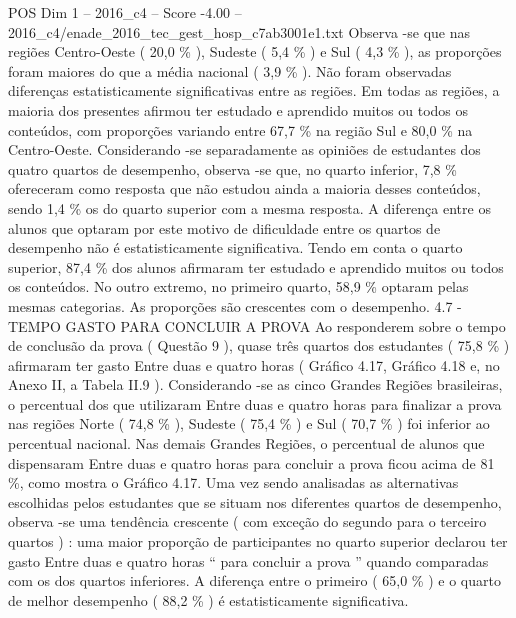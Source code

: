 \begin{textsample}{POS Dim 1 – 2016\_c4 – Score -4.00 – 2016\_c4/enade\_2016\_tec\_gest\_hosp\_c7ab3001e1.txt}
Observa -se que nas regiões Centro-Oeste ( 20,0 \% ), Sudeste ( 5,4 \% ) e Sul ( 4,3 \% ), as proporções foram maiores do que a média nacional ( 3,9 \% ).
Não foram observadas diferenças estatisticamente significativas entre as regiões.
Em todas as regiões, a maioria dos presentes afirmou ter estudado e aprendido muitos ou todos os conteúdos, com proporções variando entre 67,7 \% na região Sul e 80,0 \% na Centro-Oeste.
Considerando -se separadamente as opiniões de estudantes dos quatro quartos de desempenho, observa -se que, no quarto inferior, 7,8 \% ofereceram como resposta que não estudou ainda a maioria desses conteúdos, sendo 1,4 \% os do quarto superior com a mesma resposta.
A diferença entre os alunos que optaram por este motivo de dificuldade entre os quartos de desempenho não é estatisticamente significativa.
Tendo em conta o quarto superior, 87,4 \% dos alunos afirmaram ter estudado e aprendido muitos ou todos os conteúdos.
No outro extremo, no primeiro quarto, 58,9 \% optaram pelas mesmas categorias.
As proporções são crescentes com o desempenho. 4.7 - TEMPO GASTO PARA CONCLUIR A PROVA Ao responderem sobre o tempo de conclusão da prova ( Questão 9 ), quase três quartos dos estudantes ( 75,8 \% ) afirmaram ter gasto Entre duas e quatro horas ( Gráfico 4.17, Gráfico 4.18 e, no Anexo II, a Tabela II.9 ).
Considerando -se as cinco Grandes Regiões brasileiras, o percentual dos que utilizaram Entre duas e quatro horas para finalizar a prova nas regiões Norte ( 74,8 \% ), Sudeste ( 75,4 \% ) e Sul ( 70,7 \% ) foi inferior ao percentual nacional.
Nas demais Grandes Regiões, o percentual de alunos que dispensaram Entre duas e quatro horas para concluir a prova ficou acima de 81 \%, como mostra o Gráfico 4.17.
Uma vez sendo analisadas as alternativas escolhidas pelos estudantes que se situam nos diferentes quartos de desempenho, observa -se uma tendência crescente ( com exceção do segundo para o terceiro quartos ) : uma maior proporção de participantes no quarto superior declarou ter gasto Entre duas e quatro horas “ para concluir a prova ” quando comparadas com os dos quartos inferiores.
A diferença entre o primeiro ( 65,0 \% ) e o quarto de melhor desempenho ( 88,2 \% ) é estatisticamente significativa.

\end{textsample}
